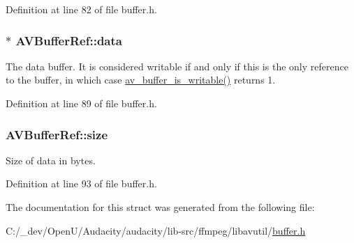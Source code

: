 Definition at line 82 of file buffer.\+h.

\subsubsection[{\texorpdfstring{data}{data}}]{$\ast$ A\+V\+Buffer\+Ref\+::data}\hypertarget{struct_a_v_buffer_ref_acb8452e99cd75074b93800b532c6ea4b}{}\label{struct_a_v_buffer_ref_acb8452e99cd75074b93800b532c6ea4b}
The data buffer. It is considered writable if and only if this is the only reference to the buffer, in which case \hyperlink{group__lavu__buffer_ga060be34ace567ae378fd0a786e847053}{av\+\_\+buffer\+\_\+is\+\_\+writable()} returns 1. 

Definition at line 89 of file buffer.\+h.

\subsubsection[{\texorpdfstring{size}{size}}]{ A\+V\+Buffer\+Ref\+::size}\hypertarget{struct_a_v_buffer_ref_a55f17b82a5af97259a5e8a3fd9647a08}{}\label{struct_a_v_buffer_ref_a55f17b82a5af97259a5e8a3fd9647a08}
Size of data in bytes. 

Definition at line 93 of file buffer.\+h.



The documentation for this struct was generated from the following file\+:\begin{DoxyCompactItemize}
\item 
C\+:/\+\_\+dev/\+Open\+U/\+Audacity/audacity/lib-\/src/ffmpeg/libavutil/\hyperlink{ffmpeg_2libavutil_2buffer_8h}{buffer.\+h}\end{DoxyCompactItemize}
